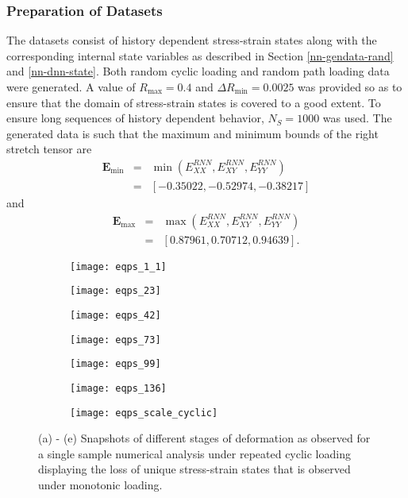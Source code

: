 \subsubsection{Preparation of Datasets} The datasets consist of history dependent stress-strain states along with the corresponding internal state variables as described in Section \ref{nn-gendata-rand} and \ref{nn-dnn-state}. Both random cyclic loading and random path loading data were generated. A value of $ R_\text{max}=0.4 $ and $ \Delta R_\text{min}=0.0025 $ was provided so as to ensure that the domain of stress-strain states is covered to a good extent. To ensure long sequences of history dependent behavior, $ N_S=1000 $ was used. The generated data is such that the maximum and minimum bounds of the right stretch tensor are
\begin{eqnarray}\label{eq-rnn-res1}
\textbf{E}_\text{min}&=&\min\left(E_{XX}^{RNN},E_{XY}^{RNN},E_{YY}^{RNN}\right)\nonumber\\&=&\left[-0.35022, -0.52974, -0.38217\right]\nonumber
\end{eqnarray}
and
\begin{eqnarray}\label{eq-rnn-res2}
\textbf{E}_\text{max}&=&\max\left(E_{XX}^{RNN},E_{XY}^{RNN},E_{YY}^{RNN}\right)\nonumber\\&=&\left[0.87961, 0.70712, 0.94639\right].\nonumber
\end{eqnarray}

\begin{figure}
	\centering
	\begin{subfigure}[t]{0.45\textwidth}
		\texttt{[image: eqps\_1\_1]}
	\caption{}
	\end{subfigure}
	\begin{subfigure}[t]{0.45\textwidth}
		\texttt{[image: eqps\_23]}
	\caption{}
	\end{subfigure}
	\begin{subfigure}[t]{0.45\textwidth}
		\texttt{[image: eqps\_42]}
	\caption{}
	\end{subfigure}
	\begin{subfigure}[t]{0.45\textwidth}
		\texttt{[image: eqps\_73]}
	\caption{}
	\end{subfigure}
	\begin{subfigure}[t]{0.45\textwidth}
		\texttt{[image: eqps\_99]}
	\caption{}
	\end{subfigure}
	\begin{subfigure}[t]{0.45\textwidth}
		\texttt{[image: eqps\_136]}
	\caption{}
	\end{subfigure}
	\begin{subfigure}[t]{0.5\textwidth}
		\texttt{[image: eqps\_scale\_cyclic]}
	\end{subfigure}
	\caption{(a) - (e) Snapshots of different stages of deformation as observed for a single sample numerical analysis under repeated cyclic loading displaying the loss of unique stress-strain states that is observed under monotonic loading.}\label{fig-rnn-1-1}
\end{figure}

